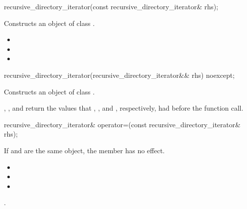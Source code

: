 \begin{itemdecl}
recursive_directory_iterator(const recursive_directory_iterator& rhs);
\end{itemdecl}

\begin{itemdescr}
\pnum
\effects Constructs an object of class .

\pnum
\postconditions
\begin{itemize}
\item {}
\item {}
\item {}
\end{itemize}
\end{itemdescr}

\begin{itemdecl}
recursive_directory_iterator(recursive_directory_iterator&& rhs) noexcept;
\end{itemdecl}

\begin{itemdescr}
\pnum
\effects Constructs an object of class .

\pnum
\postconditions {}, ,
  and  return the values that
  , , and
  , respectively, had before the function call.
\end{itemdescr}

\begin{itemdecl}
recursive_directory_iterator& operator=(const recursive_directory_iterator& rhs);
\end{itemdecl}

\begin{itemdescr}
\pnum
\effects If  and  are the same
  object, the member has no effect.

\pnum
\postconditions
\begin{itemize}
\item {}
\item {}
\item {}
\end{itemize}

\pnum
\returns {}.
\end{itemdescr}

